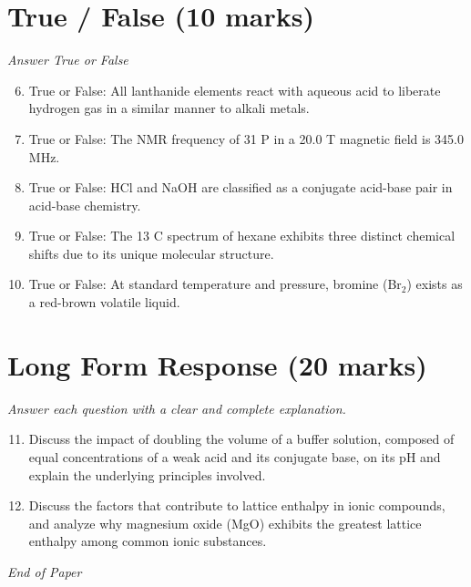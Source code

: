 \documentclass[12pt]{article}
\begin{document}
\section*{True / False (10 marks)}
\textit{Answer True or False}
\begin{enumerate}[label=\arabic*.]
\setcounter{enumi}{5}
\item True or False: All lanthanide elements react with aqueous acid to liberate hydrogen gas in a similar manner to alkali metals.
\item True or False: The NMR frequency of 31 P in a 20.0 T magnetic field is 345.0 MHz.
\item True or False: HCl and NaOH are classified as a conjugate acid-base pair in acid-base chemistry.
\item True or False: The 13 C spectrum of hexane exhibits three distinct chemical shifts due to its unique molecular structure.
\item True or False: At standard temperature and pressure, bromine (Br$_{2}$) exists as a red-brown volatile liquid.
\end{enumerate}

\section*{Long Form Response (20 marks)}
\textit{Answer each question with a clear and complete explanation.}
\begin{enumerate}[label=\arabic*.]
\setcounter{enumi}{10}
\item Discuss the impact of doubling the volume of a buffer solution, composed of equal concentrations of a weak acid and its conjugate base, on its pH and explain the underlying principles involved.
\item Discuss the factors that contribute to lattice enthalpy in ionic compounds, and analyze why magnesium oxide (MgO) exhibits the greatest lattice enthalpy among common ionic substances.
\end{enumerate}

\vfill
\noindent\textit{End of Paper}
\end{document}
